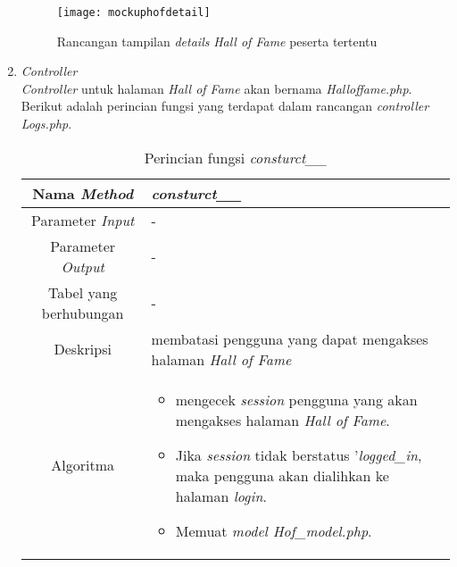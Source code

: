 \begin{enumerate}
	\begin{figure}[H]
		\centering  
		\texttt{[image: mockuphofdetail]}  
		\caption[Rancangan tampilan \textit{details} \textit{Hall of Fame} peserta tertentu]{Rancangan tampilan \textit{details} \textit{Hall of Fame} peserta tertentu} 
		\label{fig:mockuphofdetail} 
	\end{figure}
	
	\item \textit{Controller} \\
	\textit{Controller} untuk halaman \textit{Hall of Fame} akan bernama \textit{Halloffame.php}. Berikut adalah perincian fungsi yang terdapat dalam rancangan \textit{controller Logs.php}.
	\begin{table}[H]
		\caption{Perincian fungsi \textit{consturct\_\_}}
		\begin{tabular}{|c|p{11cm}|}
			\hline
			Nama \textit{Method} 	& 	\textit{consturct\_\_} 	\\
			\hline
			Parameter \textit{Input} & - \\
			\hline
			Parameter \textit{Output} &  - \\
			\hline
			Tabel yang berhubungan & - \\
			\hline
			Deskripsi	& membatasi pengguna yang dapat mengakses halaman \textit{Hall of Fame}	 \\
			\hline
			Algoritma	& \begin{itemize}
				\item mengecek \textit{session} pengguna yang akan mengakses halaman \textit{Hall of Fame}.
				\item Jika \textit{session} tidak berstatus '\textit{logged\_in}, maka pengguna akan dialihkan ke halaman \textit{login}.
				\item Memuat \textit{model Hof\_model.php}.
			\end{itemize} \\
			\hline
		\end{tabular}
	\end{table}
	

\end{enumerate}
